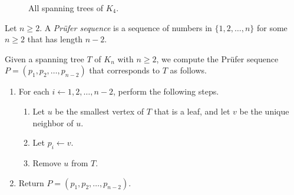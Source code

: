 \documentclass[11pt]{article}
\begin{document}
\begin{example}
\begin{figure}[h]
\begin{minipage}{0.17\textwidth}
    \end{minipage}
    \begin{minipage}{0.17\textwidth}
    \end{minipage}
    \caption{All spanning trees of $K_4$.}
  \end{figure}
\end{example}

\begin{definition}
  Let $n \geq 2$.
  A \emph{Pr\"ufer sequence} is a sequence of numbers in $\{1, 2, \dots, n\}$ for some $n \geq 2$ that has length $n-2$.
\end{definition}

\begin{algorithm}[Encoding]
  Given a spanning tree $T$ of $K_n$ with $n \geq 2$, we compute the Pr\"ufer sequence $P = (p_1, p_2, \dots, p_{n-2})$ that corresponds to $T$ as follows.
  \begin{enumerate}[label=\arabic*.]
    \item For each $i \gets 1, 2, \dots, n-2$, perform the following steps.
    \begin{enumerate}[label*=\arabic*.]
      \item Let $u$ be the smallest vertex of $T$ that is a leaf, and let $v$ be the unique neighbor of $u$.
      \item Let $p_i \gets v$.
      \item Remove $u$ from $T$.
    \end{enumerate}
    \item Return $P = (p_1, p_2, \dots, p_{n-2})$.
  \end{enumerate}
\end{algorithm}
\end{document}
